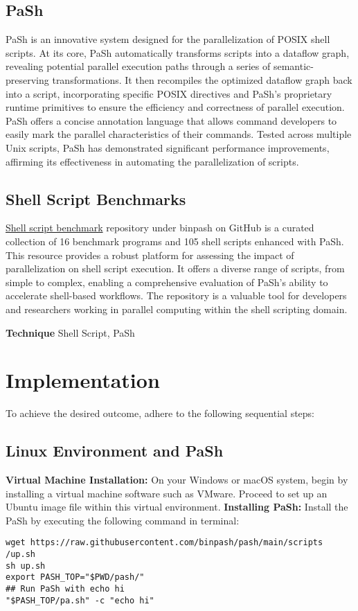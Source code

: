 \documentclass[sigplan, screen, 10pt]{acmart}
\begin{document}
\subsection{PaSh}
PaSh\cite{vasilakis2021pash} is an innovative system designed for the parallelization of POSIX shell scripts.
At its core, PaSh automatically transforms scripts into a dataflow graph, revealing potential parallel execution paths through a series of semantic-preserving transformations.
It then recompiles the optimized dataflow graph back into a script, incorporating specific POSIX directives and PaSh's proprietary runtime primitives to ensure the efficiency and correctness of parallel execution.
PaSh offers a concise annotation language that allows command developers to easily mark the parallel characteristics of their commands. 
Tested across multiple Unix scripts, PaSh has demonstrated significant performance improvements, affirming its effectiveness in automating the parallelization of scripts.
\subsection{Shell Script Benchmarks}
\href{https://github.com/binpash/benchmarks}{Shell script benchmark} repository under binpash on GitHub is a curated collection of 16 benchmark programs and 105 shell scripts enhanced with PaSh. 
This resource provides a robust platform for assessing the impact of parallelization on shell script execution. 
It offers a diverse range of scripts, from simple to complex, enabling a comprehensive evaluation of PaSh's ability to accelerate shell-based workflows.
The repository is a valuable tool for developers and researchers working in parallel computing within the shell scripting domain.\newline

\textbf{Technique} Shell Script, PaSh

\section{Implementation}
\label{tec}
To achieve the desired outcome, adhere to the following sequential steps:
\subsection{Linux Environment and PaSh}
\textbf{Virtual Machine Installation:} On your Windows or macOS system, begin by installing a virtual machine software such as VMware. Proceed to set up an Ubuntu image file within this virtual environment.\newline
\textbf{Installing PaSh:} Install the PaSh by executing the following command in terminal:
\begin{verbatim}
wget https://raw.githubusercontent.com/binpash/pash/main/scripts
/up.sh
sh up.sh
export PASH_TOP="$PWD/pash/"
## Run PaSh with echo hi
"$PASH_TOP/pa.sh" -c "echo hi"
\end{verbatim}
\end{document}

